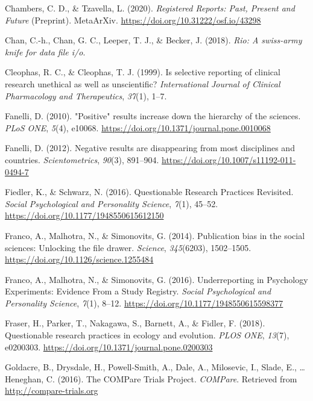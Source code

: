 \documentclass[british,,jou,floatsintext]{apa6}
\begin{document}
\leavevmode\hypertarget{ref-Chambers2020}{}%
Chambers, C. D., \& Tzavella, L. (2020). \emph{Registered Reports: Past, Present and Future} (Preprint). MetaArXiv. \url{https://doi.org/10.31222/osf.io/43298}

\leavevmode\hypertarget{ref-R-rio}{}%
Chan, C.-h., Chan, G. C., Leeper, T. J., \& Becker, J. (2018). \emph{Rio: A swiss-army knife for data file i/o}.

\leavevmode\hypertarget{ref-Cleophas1999}{}%
Cleophas, R. C., \& Cleophas, T. J. (1999). Is selective reporting of clinical research unethical as well as unscientific? \emph{International Journal of Clinical Pharmacology and Therapeutics}, \emph{37}(1), 1--7.

\leavevmode\hypertarget{ref-Fanelli2010}{}%
Fanelli, D. (2010). "Positive" results increase down the hierarchy of the sciences. \emph{PLoS ONE}, \emph{5}(4), e10068. \url{https://doi.org/10.1371/journal.pone.0010068}

\leavevmode\hypertarget{ref-Fanelli2012}{}%
Fanelli, D. (2012). Negative results are disappearing from most disciplines and countries. \emph{Scientometrics}, \emph{90}(3), 891--904. \url{https://doi.org/10.1007/s11192-011-0494-7}

\leavevmode\hypertarget{ref-Fiedler2016}{}%
Fiedler, K., \& Schwarz, N. (2016). Questionable Research Practices Revisited. \emph{Social Psychological and Personality Science}, \emph{7}(1), 45--52. \url{https://doi.org/10.1177/1948550615612150}

\leavevmode\hypertarget{ref-Franco2014}{}%
Franco, A., Malhotra, N., \& Simonovits, G. (2014). Publication bias in the social sciences: Unlocking the file drawer. \emph{Science}, \emph{345}(6203), 1502--1505. \url{https://doi.org/10.1126/science.1255484}

\leavevmode\hypertarget{ref-Franco2016}{}%
Franco, A., Malhotra, N., \& Simonovits, G. (2016). Underreporting in Psychology Experiments: Evidence From a Study Registry. \emph{Social Psychological and Personality Science}, \emph{7}(1), 8--12. \url{https://doi.org/10.1177/1948550615598377}

\leavevmode\hypertarget{ref-Fraser2018}{}%
Fraser, H., Parker, T., Nakagawa, S., Barnett, A., \& Fidler, F. (2018). Questionable research practices in ecology and evolution. \emph{PLOS ONE}, \emph{13}(7), e0200303. \url{https://doi.org/10.1371/journal.pone.0200303}

\leavevmode\hypertarget{ref-Goldacre2016}{}%
Goldacre, B., Drysdale, H., Powell-Smith, A., Dale, A., Milosevic, I., Slade, E., \ldots{} Heneghan, C. (2016). The COMPare Trials Project. \emph{COMPare}. Retrieved from \url{http://compare-trials.org}
\end{document}
